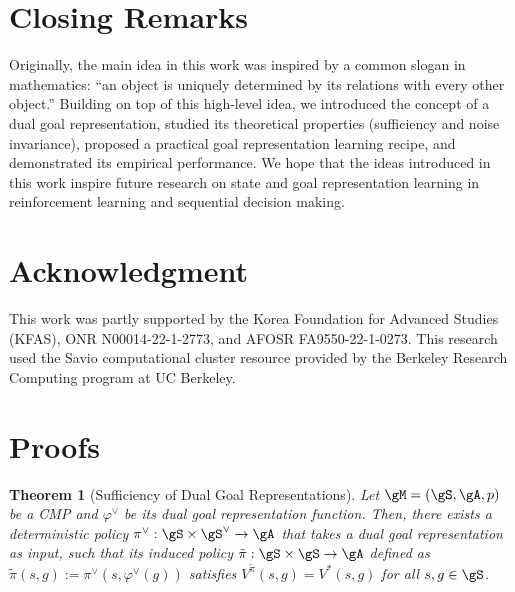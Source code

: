 \documentclass[final]{article} %
\theoremstyle{plain}
\newtheorem{theorem}{Theorem}[section]
\theoremstyle{definition}
\theoremstyle{remark}
\renewcommand{\phi}{\varphi}
\newcommand{\cutsectionup}{\vspace{-2pt}}
\newcommand{\cutsectiondown}{\vspace{-3pt}}
\begin{document}
\cutsectionup
\section{Closing Remarks}
\cutsectiondown

Originally, the main idea in this work was inspired by
a common slogan in mathematics: ``an object is uniquely determined by its relations with every other object.''
Building on top of this high-level idea,
we introduced the concept of a dual goal representation,
studied its theoretical properties (sufficiency and noise invariance),
proposed a practical goal representation learning recipe,
and demonstrated its empirical performance.
We hope that the ideas introduced in this work
inspire future research on state and goal representation learning
in reinforcement learning and sequential decision making.

\section*{Acknowledgment}
This work was partly supported by the Korea Foundation for Advanced Studies (KFAS), ONR N00014-22-1-2773, and AFOSR FA9550-22-1-0273.
This research used the Savio computational cluster resource provided by the Berkeley Research Computing program at UC Berkeley.

%
%








\clearpage

\appendix


\section{Proofs}
\label{sec:proofs}


\begin{theorem}[Sufficiency of Dual Goal Representations]
Let $\gM=(\gS, \gA, p)$ be a CMP and $\phi^\vee$ be its dual goal representation function.
Then, there exists a deterministic policy $\pi^\vee: \gS \times \gS^\vee \to \gA$ that takes a dual goal representation as input,
such that its induced policy $\tilde \pi: \gS \times \gS \to \gA$ defined as
$\tilde \pi(s, g) := \pi^\vee(s, \phi^\vee(g))$ satisfies $V^{\tilde \pi} (s, g) = V^*(s, g)$ for all $s, g \in \gS$.
\end{theorem}
\end{document}
